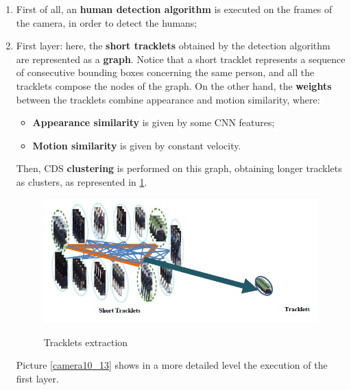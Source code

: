 \begin{enumerate}
    \item First of all, an \textbf{human detection algorithm} is executed on the frames of the camera, in order to detect the humans;
    \item First layer: here, the \textbf{short tracklets} obtained by the detection algorithm are represented as a \textbf{graph}. Notice that a short tracklet represents a sequence of consecutive bounding boxes concerning the same person, and all the tracklets compose the nodes of the graph. On the other hand, the \textbf{weights} between the tracklets combine appearance and motion similarity, where:
    \begin{itemize}
        \item \textbf{Appearance similarity} is given by some CNN features;
        \item \textbf{Motion similarity} is given by constant velocity.
    \end{itemize}
    Then, CDS \textbf{clustering} is performed on this graph, obtaining longer tracklets as clusters, as represented in \ref{camera7}.
    
    \begin{figure}[h!]
        \centering
        \includegraphics[scale = 1.4]{img/camera7.jpg}
        \label{camera7}
        \caption{Tracklets extraction}
    \end{figure}

    Picture \ref{camera10_13} shows in a more detailed level the execution of the first layer.


\end{enumerate}
